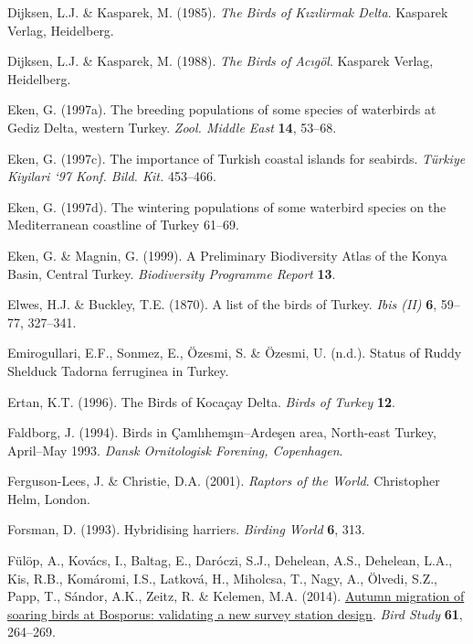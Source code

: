 \documentclass[
  a4paper,
  DIV=11,
  numbers=noendperiod]{scrreprt}
\newlength{\cslhangindent}
\newenvironment{CSLReferences}[2] %
 {\begin{list}{}{%
  \setlength{\itemindent}{0pt}
  \setlength{\leftmargin}{0pt}
  \setlength{\parsep}{0pt}
  \ifodd #1
   \setlength{\leftmargin}{\cslhangindent}
   \setlength{\itemindent}{-1\cslhangindent}
  \fi
  \setlength{\itemsep}{#2\baselineskip}}}
 {\end{list}}
\begin{document}
\begin{CSLReferences}{1}{1}
Dijksen, L.J. \& Kasparek, M. (1985). \emph{{The Birds of Kızılirmak
Delta}}. Kasparek Verlag, Heidelberg.

Dijksen, L.J. \& Kasparek, M. (1988). \emph{{The Birds of Acıgöl}}.
Kasparek Verlag, Heidelberg.

Eken, G. (1997a). {The breeding populations of some species of
waterbirds at Gediz Delta, western Turkey}. \emph{Zool. Middle East}
\textbf{14}, 53--68.

Eken, G. (1997c). {The importance of Turkish coastal islands for
seabirds}. \emph{Türkiye Kiyilari `97 Konf. Bild. Kit.} 453--466.

Eken, G. (1997d). {The wintering populations of some waterbird species
on the Mediterranean coastline of Turkey} 61--69.

Eken, G. \& Magnin, G. (1999). {A Preliminary Biodiversity Atlas of the
Konya Basin, Central Turkey}. \emph{Biodiversity Programme Report}
\textbf{13}.

Elwes, H.J. \& Buckley, T.E. (1870). {A list of the birds of Turkey}.
\emph{Ibis (II)} \textbf{6}, 59--77, 327--341.

Emirogullari, E.F., Sonmez, E., Özesmi, S. \& Özesmi, U. (n.d.). {Status
of Ruddy Shelduck Tadorna ferruginea in Turkey}.

Ertan, K.T. (1996). {The Birds of Kocaçay Delta}. \emph{Birds of Turkey}
\textbf{12}.

Faldborg, J. (1994). {Birds in Çamlıhemşın--Ardeşen area, North-east
Turkey, April--May 1993}. \emph{Dansk Ornitologisk Forening,
Copenhagen}.

Ferguson-Lees, J. \& Christie, D.A. (2001). \emph{{Raptors of the
World}}. Christopher Helm, London.

Forsman, D. (1993). {Hybridising harriers}. \emph{Birding World}
\textbf{6}, 313.

Fülöp, A., Kovács, I., Baltag, E., Daróczi, S.J., Dehelean, A.S.,
Dehelean, L.A., Kis, R.B., Komáromi, I.S., Latková, H., Miholcsa, T.,
Nagy, A., Ölvedi, S.Z., Papp, T., Sándor, A.K., Zeitz, R. \& Kelemen,
M.A. (2014). \href{https://doi.org/10.1080/00063657.2014.907236}{{Autumn
migration of soaring birds at Bosporus: validating a new survey station
design}}. \emph{Bird Study} \textbf{61}, 264--269.


\end{CSLReferences}
\end{document}
